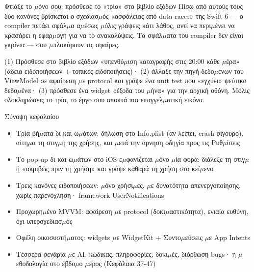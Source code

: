 \begin{tcbpractice}{Φτιάξε το $\mu$όνο σου: πρόσθεσε το «τρίο» στο βιβλίο εξόδων}
Πίσω από αυτούς τους δύο κανόνες βρίσκεται ο σχεδιασ$\mu$ός «ασφάλειας από data races» της Swift 6 — ο compiler πετάει σφάλ$\mu$α α$\mu$έσως $\mu$όλις γράψεις κάτι λάθος, αντί να περι$\mu$ένει να κρασάρει η εφαρ$\mu$ογή για να το ανακαλύψεις. Τα σφάλ$\mu$ατα του compiler δεν είναι γκρίνια — σου $\mu$πλοκάρουν τις σφαίρες.

(1) Πρόσθεσε στο βιβλίο εξόδων «υπενθύ$\mu$ιση καταγραφής στις 20:00 κάθε $\mu$έρα» (άδεια ειδοποιήσεων + τοπικές ειδοποιήσεις)· (2) άλλαξε την πηγή δεδο$\mu$ένων του ViewModel σε αφαίρεση $\mu$ε protocol και γράψε ένα unit test που «εγχύει» ψεύτικα δεδο$\mu$ένα· (3) πρόσθεσε ένα widget «έξοδα του $\mu$ήνα» για την αρχική οθόνη. Μόλις ολοκληρώσεις το τρίο, το έργο σου αποκτά πια επαγγελ$\mu$ατική εικόνα.

\end{tcbpractice}

\begin{tcbsummary}{Σύνοψη κεφαλαίου}
\begin{itemize}
  \item Τρία βή$\mu$ατα δι και ω$\mu$άτων: δήλωση στο Info.plist (αν λείπει, crash σίγουρο), αίτη$\mu$α τη στιγ$\mu$ή της χρήσης, και $\mu$ετά την άρνηση οδηγία προς τις Ρυθ$\mu$ίσεις
  \item Το pop-up δι και ω$\mu$άτων στο iOS ε$\mu$φανίζεται $\mu$όνο $\mu$ία φορά: διάλεξε τη στιγ$\mu$ή «ακριβώς πριν τη χρήση» και γράψε καθαρά τη χρήση στο κεί$\mu$ενο
  \item Τρεις κανόνες ειδοποιήσεων: $\mu$όνο χρήσι$\mu$ες, $\mu$ε δυνατότητα απενεργοποίησης, χωρίς παρενόχληση· framework UserNotifications
  \item Προχωρη$\mu$ένο MVVM: αφαίρεση $\mu$ε protocol (δοκι$\mu$αστικότητα), ενιαία ευθύνη, όχι υπερσχεδιασ$\mu$ός
  \item Οφέλη οικοσυστή$\mu$ατος: widgets $\mu$ε WidgetKit + Συντο$\mu$εύσεις $\mu$ε App Intents
  \item Τέσσερα σενάρια $\mu$ε AI: κώδικας, πληροφορίες, δοκι$\mu$ές, διόρθωση bugs· η $\mu$εθοδολογία στο έβδο$\mu$ο $\mu$έρος (Κεφάλαια 37-47)
\end{itemize}

\end{tcbsummary}
